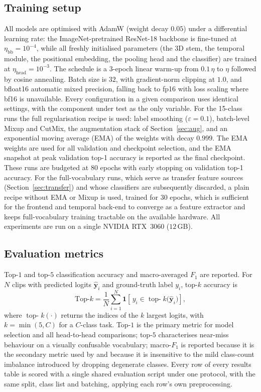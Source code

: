 \documentclass[10pt, a4paper]{article}
\begin{document}
\subsection{Training setup}
\label{sec:train}
\noindent All models are optimised with AdamW (weight decay $0.05$) under a differential learning rate: the ImageNet-pretrained ResNet-18 backbone is fine-tuned at $\eta_\text{bb}=10^{-4}$, while all freshly initialised parameters (the 3D stem, the temporal module, the positional embedding, the pooling head and the classifier) are trained at $\eta_\text{head}=10^{-3}$. The schedule is a $3$-epoch linear warm-up from $0.1\,\eta$ to $\eta$ followed by cosine annealing. Batch size is $32$, with gradient-norm clipping at $1.0$, and bfloat16 automatic mixed precision, falling back to fp16 with loss scaling where bf16 is unavailable. Every configuration in a given comparison uses identical settings, with the component under test as the only variable.
\noindent For the 15-class runs the full regularisation recipe is used: label smoothing ($\varepsilon=0.1$), batch-level Mixup and CutMix, the augmentation stack of Section~\ref{sec:aug}, and an exponential moving average (EMA) of the weights with decay $0.999$. The EMA weights are used for all validation and checkpoint selection, and the EMA snapshot at peak validation top-1 accuracy is reported as the final checkpoint. These runs are budgeted at $80$ epochs with early stopping on validation top-1 accuracy. For the full-vocabulary runs, which serve as transfer feature sources (Section~\ref{sec:transfer}) and whose classifiers are subsequently discarded, a plain recipe without EMA or Mixup is used, trained for $30$ epochs, which is sufficient for the frontend and temporal back-end to converge as a feature extractor and keeps full-vocabulary training tractable on the available hardware. All experiments are run on a single NVIDIA RTX~3060 ($12$\,GB).
\subsection{Evaluation metrics}
\label{sec:metrics}
\noindent Top-$1$ and top-$5$ classification accuracy and macro-averaged $F_1$ are reported. For $N$ clips with predicted logits $\hat{\mathbf{y}}_i$ and ground-truth label $y_i$, top-$k$ accuracy is
\[
\text{Top-}k = \frac{1}{N}\sum_{i=1}^{N}
\mathbf{1}\!\left[\, y_i \in \operatorname{top\text{-}}k\big(\hat{\mathbf{y}}_i\big) \right],
\]
where $\operatorname{top\text{-}}k(\cdot)$ returns the indices of the $k$ largest logits, with $k=\min(5,C)$ for a $C$-class task. Top-$1$ is the primary metric for model selection and all head-to-head comparisons; top-$5$ characterises near-miss behaviour on a visually confusable vocabulary; macro-$F_1$ is reported because it is the secondary metric used by \citet{ameer2024} and because it is insensitive to the mild class-count imbalance introduced by dropping degenerate classes. Every row of every results table is scored with a single shared evaluation script under one protocol, with the same split, class list and batching, applying each row's own preprocessing.
\end{document}
